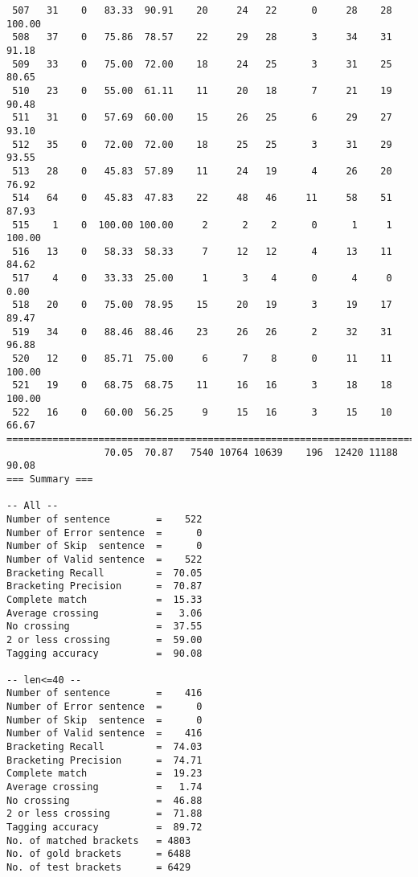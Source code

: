\begin{verbatim}
 507   31    0   83.33  90.91    20     24   22      0     28    28   100.00
 508   37    0   75.86  78.57    22     29   28      3     34    31    91.18
 509   33    0   75.00  72.00    18     24   25      3     31    25    80.65
 510   23    0   55.00  61.11    11     20   18      7     21    19    90.48
 511   31    0   57.69  60.00    15     26   25      6     29    27    93.10
 512   35    0   72.00  72.00    18     25   25      3     31    29    93.55
 513   28    0   45.83  57.89    11     24   19      4     26    20    76.92
 514   64    0   45.83  47.83    22     48   46     11     58    51    87.93
 515    1    0  100.00 100.00     2      2    2      0      1     1   100.00
 516   13    0   58.33  58.33     7     12   12      4     13    11    84.62
 517    4    0   33.33  25.00     1      3    4      0      4     0     0.00
 518   20    0   75.00  78.95    15     20   19      3     19    17    89.47
 519   34    0   88.46  88.46    23     26   26      2     32    31    96.88
 520   12    0   85.71  75.00     6      7    8      0     11    11   100.00
 521   19    0   68.75  68.75    11     16   16      3     18    18   100.00
 522   16    0   60.00  56.25     9     15   16      3     15    10    66.67
============================================================================
                 70.05  70.87   7540 10764 10639    196  12420 11188    90.08
=== Summary ===

-- All --
Number of sentence        =    522
Number of Error sentence  =      0
Number of Skip  sentence  =      0
Number of Valid sentence  =    522
Bracketing Recall         =  70.05
Bracketing Precision      =  70.87
Complete match            =  15.33
Average crossing          =   3.06
No crossing               =  37.55
2 or less crossing        =  59.00
Tagging accuracy          =  90.08

-- len<=40 --
Number of sentence        =    416
Number of Error sentence  =      0
Number of Skip  sentence  =      0
Number of Valid sentence  =    416
Bracketing Recall         =  74.03
Bracketing Precision      =  74.71
Complete match            =  19.23
Average crossing          =   1.74
No crossing               =  46.88
2 or less crossing        =  71.88
Tagging accuracy          =  89.72
No. of matched brackets   = 4803
No. of gold brackets      = 6488
No. of test brackets      = 6429

\end{verbatim}

\normalsize

